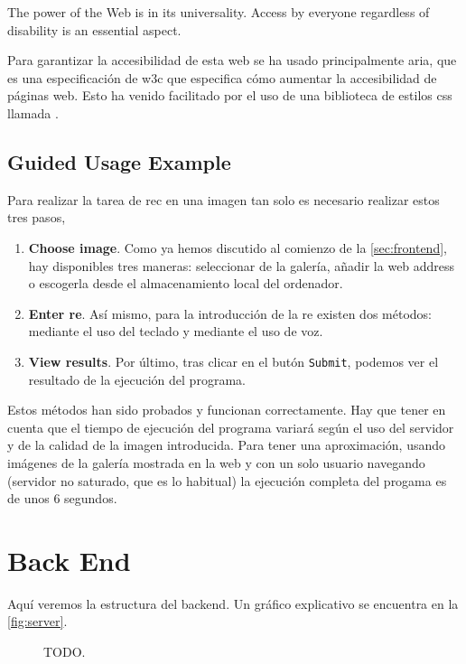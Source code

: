 \begin{quoteBox}
  The power of the Web is in its universality. Access by everyone regardless of
  disability is an essential aspect.
  \tcblower{}
\end{quoteBox}

Para garantizar la accesibilidad de esta web se ha usado principalmente
\gls{aria}, que es una especificación de \gls{w3c} que especifica cómo aumentar
la accesibilidad de páginas web. Esto ha venido facilitado por el uso de una
biblioteca de estilos \gls{css} llamada
.

\subsection{Guided Usage Example}

Para realizar la tarea de \gls{rec} en una imagen tan solo es necesario
realizar estos tres pasos,
\begin{enumerate}
  \item \textbf{Choose image}. Como ya hemos discutido al comienzo de la
  \vref{sec:frontend}, hay disponibles tres maneras: seleccionar de la galería,
  añadir la web address o escogerla desde el almacenamiento local del
  ordenador.
  \item \textbf{Enter \gls*{re}}. Así mismo, para la introducción de la
  \gls{re} existen dos métodos: mediante el uso del teclado y mediante el uso
  de voz.
  \item \textbf{View results}. Por último, tras clicar en el butón
  \texttt{Submit}, podemos ver el resultado de la ejecución del programa.
\end{enumerate}

Estos métodos han sido probados y funcionan correctamente. Hay que tener en
cuenta que el tiempo de ejecución del programa variará según el uso del
servidor y de la calidad de la imagen introducida. Para tener una aproximación,
usando imágenes de la galería mostrada en la web y con un solo usuario
navegando (servidor no saturado, que es lo habitual) la ejecución completa del
progama es de unos 6 segundos.


\section{Back End}\label{sec:backend}

Aquí veremos la estructura del backend. Un gráfico explicativo se encuentra en
la \vref{fig:server}.

\begin{figure}[htb]
  \centering
  
  \caption[TODO]{TODO.}
  \label{fig:server}
\end{figure}
